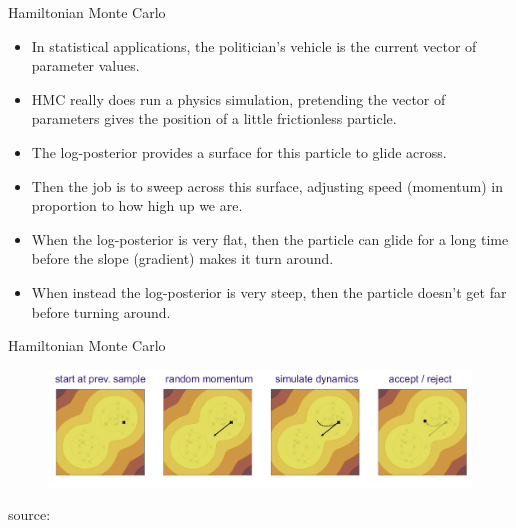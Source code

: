 \documentclass[handout]{beamer}
\begin{document}
\begin{frame}{Hamiltonian Monte Carlo}
\scriptsize{

\begin{itemize}
\item In statistical applications, the politician's vehicle is the current vector of parameter values. 


\item HMC really does run a physics simulation, pretending the vector of parameters gives the position of a little frictionless particle. 

\item The log-posterior provides a surface for this particle to glide across. 


\item Then the job is to sweep across this surface, adjusting speed (momentum) in proportion to how high up we are.



\item When the log-posterior is very flat, then the particle can glide for a long time before the slope (gradient) makes it turn around.

\item When instead the log-posterior is very steep, then the particle doesn’t get far before turning around.

\end{itemize}


} 
\end{frame}

\begin{frame}{Hamiltonian Monte Carlo}



 \begin{figure}[h!]
	\centering
	\includegraphics[scale=0.25]{pics/HMC.png}
	\end{figure} 

source: \cite{izmailov2021bayesian}

\end{frame}
\end{document}
